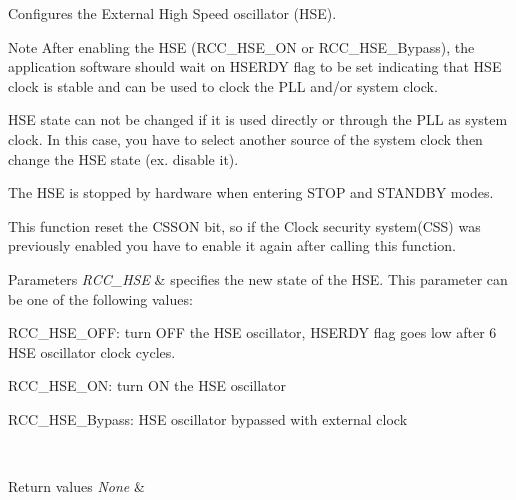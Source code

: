 Configures the External High Speed oscillator (H\+SE). 

\begin{DoxyNote}{Note}
After enabling the H\+SE (R\+C\+C\+\_\+\+H\+S\+E\+\_\+\+ON or R\+C\+C\+\_\+\+H\+S\+E\+\_\+\+Bypass), the application software should wait on H\+S\+E\+R\+DY flag to be set indicating that H\+SE clock is stable and can be used to clock the P\+LL and/or system clock. 

H\+SE state can not be changed if it is used directly or through the P\+LL as system clock. In this case, you have to select another source of the system clock then change the H\+SE state (ex. disable it). 

The H\+SE is stopped by hardware when entering S\+T\+OP and S\+T\+A\+N\+D\+BY modes. 

This function reset the C\+S\+S\+ON bit, so if the Clock security system(\+C\+S\+S) was previously enabled you have to enable it again after calling this function. 
\end{DoxyNote}

\begin{DoxyParams}{Parameters}
{\em R\+C\+C\+\_\+\+H\+SE} & specifies the new state of the H\+SE. This parameter can be one of the following values\+: \begin{DoxyItemize}
\item R\+C\+C\+\_\+\+H\+S\+E\+\_\+\+O\+FF\+: turn O\+FF the H\+SE oscillator, H\+S\+E\+R\+DY flag goes low after 6 H\+SE oscillator clock cycles. \item R\+C\+C\+\_\+\+H\+S\+E\+\_\+\+ON\+: turn ON the H\+SE oscillator \item R\+C\+C\+\_\+\+H\+S\+E\+\_\+\+Bypass\+: H\+SE oscillator bypassed with external clock \end{DoxyItemize}
\\
\hline
\end{DoxyParams}

\begin{DoxyRetVals}{Return values}
{\em None} & \\
\hline
\end{DoxyRetVals}
